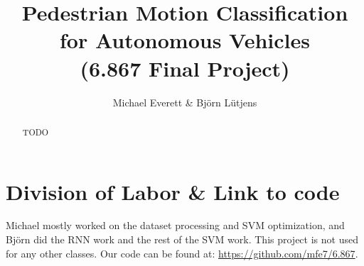 \documentclass[letterpaper, 10 pt, conference]{ieeeconf}
\title{\LARGE \bf Pedestrian Motion Classification for Autonomous Vehicles\\(6.867 Final Project)}
\author{Michael Everett \& Bj{\"o}rn L{\"u}tjens}
\begin{document}
\maketitle
\thispagestyle{empty} \pagestyle{empty}


\begin{abstract}
TODO
\end{abstract}




% 









\section*{Division of Labor \& Link to code}
Michael mostly worked on the dataset processing and SVM optimization, and Bj{\"o}rn did the RNN work and the rest of the SVM work.
This project is not used for any other classes.
Our code can be found at: \url{https://github.com/mfe7/6.867}.
\balance
 
%  

\end{document}
